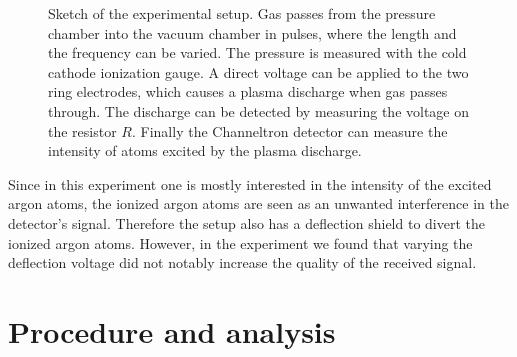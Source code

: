 \documentclass[a4paper,10pt]{article}
\begin{document}
\begin{figure}[H]
\caption{Sketch of the experimental setup. Gas passes from the pressure chamber into the vacuum chamber in pulses, where the length and the frequency can be varied. The pressure is measured with the cold cathode ionization gauge. A direct voltage can be applied to the two ring electrodes, which causes a plasma discharge when gas passes through. The discharge can be detected by measuring the voltage on the resistor $R$. Finally the Channeltron detector can measure the intensity of atoms excited by the plasma discharge. }
\label{fig_setup}
\end{figure}
Since in this experiment one is mostly interested in the intensity of the excited argon atoms, the ionized argon atoms are seen as an unwanted interference in the detector's signal. Therefore the setup also has a deflection shield to divert the ionized argon atoms. However, in the experiment we found that varying the deflection voltage did not notably increase the quality of the received signal.

\section{Procedure and analysis}
\end{document}
